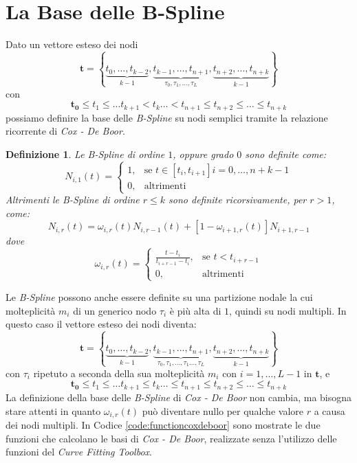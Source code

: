 \documentclass[a4paper, 12pt]{article}
\newtheorem{mydef}{Definizione}
\begin{document}
\section{La Base delle B-Spline}

Dato un vettore esteso dei nodi
$$ \mathbf{t} =  \left\{ \underbrace{t_{0}, \dots, t_{k-2}}_{k-1}, \underbrace{t_{k-1}, \dots, t_{n+1}}_{\tau_0, \tau_1, \dots, \tau_L}, \underbrace{t_{n+2}, \dots, t_{n+k}}_{k-1} \right\} $$
con
$$\mathbf{t_0} \leq t_1 \leq \dots t_{k+1} < t_k \dots < t_{n+1} \leq t_{n+2} \leq \dots \leq t_{n+k}$$
possiamo definire la base delle \textit{B-Spline} su nodi semplici tramite la relazione ricorrente di \textit{Cox - De Boor}.
\begin{mydef}
  Le \textit{B-Spline} di ordine $1$, oppure grado $0$ sono definite come:
$$N_{i, 1}(t) = \begin{cases} 1, & \text{se } t\in[t_i, t_{i+1}] i = 0, \dots, n+k-1 \\ 0, & \text{altrimenti} \end{cases}$$
  Altrimenti le \textit{B-Spline} di ordine $r \leq k$ sono definite ricorsivamente, per $r > 1$, come:
  $$N_{i, r}(t) = \omega_{i,r}(t)N_{i, r-1}(t) + [1-\omega_{i+1, r}(t)]N_{i+1, r-1}$$
  dove
$$\omega_{i,r}(t) = \begin{cases} \frac{t-t_i}{t_{i+r-1}-t_i}, & \text{se } t<t_{i+r-1} \\ 0, & \text{altrimenti} \end{cases}$$
\end{mydef}
Le \textit{B-Spline} possono anche essere definite su una partizione nodale la cui molteplicità $m_i$ di un generico nodo $\tau_i$ è più alta di $1$,
quindi su nodi multipli. In questo caso il vettore esteso dei nodi diventa:
$$ \mathbf{t} =  \left\{ \underbrace{t_{0}, \dots, t_{k-2}}_{k-1}, \underbrace{t_{k-1}, \dots, t_{n+1}}_{\tau_0, \tau_1, \dots, \tau_1 \dots, \tau_L}, \underbrace{t_{n+2}, \dots, t_{n+k}}_{k-1} \right\} $$
con $\tau_i$ ripetuto a seconda della sua molteplicità $m_i$ con $i = 1, \dots, L-1$ in $\mathbf{t}$, e
$$\mathbf{t_0} \leq t_1 \leq \dots t_{k+1} \leq  t_k \dots \leq  t_{n+1} \leq t_{n+2} \leq \dots \leq t_{n+k}$$
La definizione della base delle \textit{B-Spline} di \textit{Cox - De Boor} non cambia, ma bisogna stare attenti in quanto 
$\omega_{i,r}(t)$ può diventare nullo per qualche valore $r$  a causa dei nodi multipli.
In Codice \ref{code:functioncoxdeboor} sono mostrate le due funzioni che calcolano le basi di \textit{Cox - De Boor}, realizzate senza l'utilizzo delle funzioni del 
\textit{Curve Fitting Toolbox}.
\end{document}
